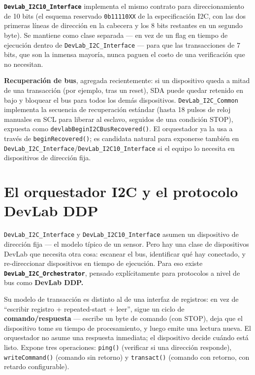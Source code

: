 \documentclass[11pt,a4paper]{article}
\newcommand{\code}[1]{\texttt{\small #1}}
\begin{document}
\textbf{\code{DevLab\_I2C10\_Interface}} implementa el mismo contrato para direccionamiento de 10 bits (el esquema reservado \code{0b11110XX} de la especificación I2C, con las dos primeras líneas de dirección en la cabecera y los 8 bits restantes en un segundo byte). Se mantiene como clase separada --- en vez de un flag en tiempo de ejecución dentro de \code{DevLab\_I2C\_Interface} --- para que las transacciones de 7 bits, que son la inmensa mayoría, nunca paguen el costo de una verificación que no necesitan.

\textbf{Recuperación de bus}, agregada recientemente: si un dispositivo queda a mitad de una transacción (por ejemplo, tras un reset), SDA puede quedar retenido en bajo y bloquear el bus para todos los demás dispositivos. \code{DevLab\_I2C\_Common} implementa la secuencia de recuperación estándar (hasta 18 pulsos de reloj manuales en SCL para liberar al esclavo, seguidos de una condición STOP), expuesta como \code{devlabBeginI2CBusRecovered()}. El orquestador ya la usa a través de \code{beginRecovered()}; es candidata natural para exponerse también en \code{DevLab\_I2C\_Interface}/\code{DevLab\_I2C10\_Interface} si el equipo lo necesita en dispositivos de dirección fija.

\section*{El orquestador I2C y el protocolo DevLab DDP}

\code{DevLab\_I2C\_Interface} y \code{DevLab\_I2C10\_Interface} asumen un dispositivo de dirección fija --- el modelo típico de un sensor. Pero hay una clase de dispositivos DevLab que necesita otra cosa: escanear el bus, identificar qué hay conectado, y re-direccionar dispositivos en tiempo de ejecución. Para eso existe \textbf{\code{DevLab\_I2C\_Orchestrator}}, pensado explícitamente para protocolos a nivel de bus como \textbf{DevLab DDP.}

Su modelo de transacción es distinto al de una interfaz de registros: en vez de ``escribir registro + repeated-start + leer'', sigue un ciclo de \textbf{comando/respuesta} --- escribe un byte de comando (con STOP), deja que el dispositivo tome su tiempo de procesamiento, y luego emite una lectura nueva. El orquestador no asume una respuesta inmediata; el dispositivo decide cuándo está listo. Expone tres operaciones: \code{ping()} (verificar si una dirección responde), \code{writeCommand()} (comando sin retorno) y \code{transact()} (comando con retorno, con retardo configurable).
\end{document}
